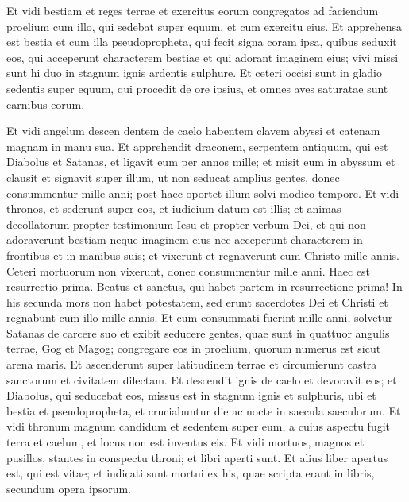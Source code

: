 \begin{biblechapter}
\begin{biblechapter}
\begin{biblechapter}
\begin{biblechapter}
\begin{biblechapter}
\begin{biblechapter}
\begin{biblechapter}
\begin{biblechapter}
\begin{biblechapter}
\begin{biblechapter}
\begin{biblechapter}
\begin{biblechapter}
\begin{biblechapter}
\begin{biblechapter}
\begin{biblechapter}
\begin{biblechapter}
\begin{biblechapter}
\begin{biblechapter}
\begin{biblechapter}
 \verse Et vidi bestiam et reges terrae et exercitus eorum congregatos ad faciendum proelium cum illo, qui sedebat super equum, et cum exercitu eius. 
\verse Et apprehensa est bestia et cum illa pseudopropheta, qui fecit signa coram ipsa, quibus seduxit eos, qui acceperunt characterem bestiae et qui adorant imaginem eius; vivi missi sunt hi duo in stagnum ignis ardentis sulphure. 
\verse Et ceteri occisi sunt in gladio sedentis super equum, qui procedit de ore ipsius, et omnes aves saturatae sunt carnibus eorum.
 
\begin{biblechapter}
\verse Et vidi angelum descen dentem de caelo habentem clavem abyssi et catenam magnam in manu sua. 
\verse Et apprehendit draconem, serpentem antiquum, qui est Diabolus et Satanas, et ligavit eum per annos mille; 
\verse et misit eum in abyssum et clausit et signavit super illum, ut non seducat amplius gentes, donec consummentur mille anni; post haec oportet illum solvi modico tempore. 
\verse Et vidi thronos, et sederunt super eos, et iudicium datum est illis; et animas decollatorum propter testimonium Iesu et propter verbum Dei, et qui non adoraverunt bestiam neque imaginem eius nec acceperunt characterem in frontibus et in manibus suis; et vixerunt et regnaverunt cum Christo mille annis. 
\verse Ceteri mortuorum non vixerunt, donec consummentur mille anni. Haec est resurrectio prima. 
\verse Beatus et sanctus, qui habet partem in resurrectione prima! In his secunda mors non habet potestatem, sed erunt sacerdotes Dei et Christi et regnabunt cum illo mille annis.
 \verse Et cum consummati fuerint mille anni, solvetur Satanas de carcere suo 
\verse et exibit seducere gentes, quae sunt in quattuor angulis terrae, Gog et Magog; congregare eos in proelium, quorum numerus est sicut arena maris. 
\verse Et ascenderunt super latitudinem terrae et circumierunt castra sanctorum et civitatem dilectam. Et descendit ignis de caelo et devoravit eos; 
\verse et Diabolus, qui seducebat eos, missus est in stagnum ignis et sulphuris, ubi et bestia et pseudopropheta, et cruciabuntur die ac nocte in saecula saeculorum.
 \verse Et vidi thronum magnum candidum et sedentem super eum, a cuius aspectu fugit terra et caelum, et locus non est inventus eis. 
\verse Et vidi mortuos, magnos et pusillos, stantes in conspectu throni; et libri aperti sunt. Et alius liber apertus est, qui est vitae; et iudicati sunt mortui ex his, quae scripta erant in libris, secundum opera ipsorum. 

\end{biblechapter}
\end{biblechapter}
\end{biblechapter}
\end{biblechapter}
\end{biblechapter}
\end{biblechapter}
\end{biblechapter}
\end{biblechapter}
\end{biblechapter}
\end{biblechapter}
\end{biblechapter}
\end{biblechapter}
\end{biblechapter}
\end{biblechapter}
\end{biblechapter}
\end{biblechapter}
\end{biblechapter}
\end{biblechapter}
\end{biblechapter}
\end{biblechapter}
